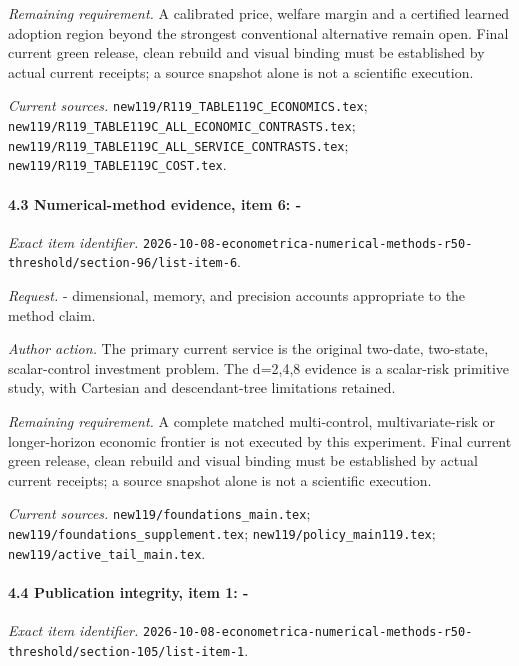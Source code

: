 \par\emph{Remaining requirement.} A calibrated price, welfare margin and a certified learned adoption region beyond the strongest conventional alternative remain open. Final current green release, clean rebuild and visual binding must be established by actual current receipts; a source snapshot alone is not a scientific execution.

\par\emph{Current sources.} \nolinkurl{new119/R119_TABLE119C_ECONOMICS.tex}; \nolinkurl{new119/R119_TABLE119C_ALL_ECONOMIC_CONTRASTS.tex}; \nolinkurl{new119/R119_TABLE119C_ALL_SERVICE_CONTRASTS.tex}; \nolinkurl{new119/R119_TABLE119C_COST.tex}.

\paragraph{4.3 Numerical-method evidence, item 6: -}

\emph{Exact item identifier.} \nolinkurl{2026-10-08-econometrica-numerical-methods-r50-threshold/section-96/list-item-6}.

\par\emph{Request.} - dimensional, memory, and precision accounts appropriate to the method claim.

\par\emph{Author action.} The primary current service is the original two-date, two-state, scalar-control investment problem. The d=2,4,8 evidence is a scalar-risk primitive study, with Cartesian and descendant-tree limitations retained.

\par\emph{Remaining requirement.} A complete matched multi-control, multivariate-risk or longer-horizon economic frontier is not executed by this experiment. Final current green release, clean rebuild and visual binding must be established by actual current receipts; a source snapshot alone is not a scientific execution.

\par\emph{Current sources.} \nolinkurl{new119/foundations_main.tex}; \nolinkurl{new119/foundations_supplement.tex}; \nolinkurl{new119/policy_main119.tex}; \nolinkurl{new119/active_tail_main.tex}.

\paragraph{4.4 Publication integrity, item 1: -}

\emph{Exact item identifier.} \nolinkurl{2026-10-08-econometrica-numerical-methods-r50-threshold/section-105/list-item-1}.

